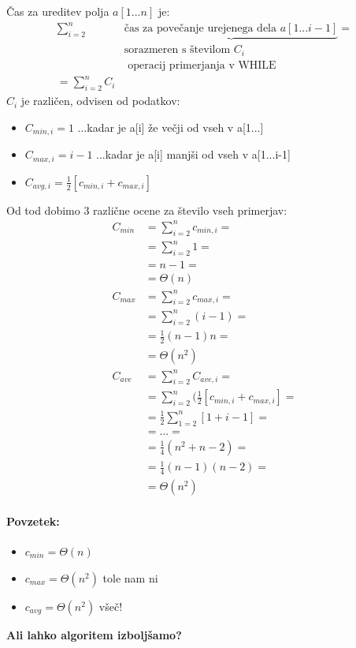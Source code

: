 \documentclass[a4paper,10pt]{article}
\begin{document}
\v Cas za ureditev polja $a[1...n]$ je:
\begin{equation}
\begin{array}{rc}
\sum_{i=2}^{n} & \underbrace{\mbox{\v cas za pove\v canje urejenega dela } a[1...i-1]} =\\
 & \mbox{sorazmeren s \v stevilom } C_i\\
 & \mbox{ operacij primerjanja v WHILE}\\
= \sum_{i=2}^{n} C_i &
\end{array}
\end{equation}
$C_i$ je razli\v cen, odvisen od podatkov:
\begin{itemize}
\item $C_{min,i}=1$ ...kadar je a[i] \v ze ve\v cji od vseh v a[1...]
\item $C_{max,i}=i-1$ ...kadar je a[i] manj\v si od vseh v a[1...i-1]
\item $C_{avg,i}=\frac{1}{2}[c_{min,i}+c_{max,i}]$
\end{itemize}
\vspace{10pt}
Od tod dobimo 3 razli\v cne ocene za \v stevilo vseh primerjav:\\
$$
\begin{array}{ll}
C_{min} & = \sum_{i=2}^{n} c_{min,i} = \\
        & = \sum_{i=2}^{n} 1 = \\
        & = n-1 = \\
        & = \Theta(n)\\
C_{max} & = \sum_{i=2}^{n} c_{max,i} = \\
        & = \sum_{i=2}^{n}(i-1) = \\
        & = \frac{1}{2}(n-1)n = \\
        & = \Theta(n^2)\\
C_{ave} & = \sum_{i=2}^{n}C_{ave,i} = \\
        & = \sum_{i=2}^{n}(\frac{1}{2}[c_{min,i}+c_{max,i}] = \\
        & = \frac{1}{2} \sum_{1=2}^{n}[1+i-1] = \\
        & = ... = \\
        & = \frac{1}{4}(n^2+n-2) = \\
        & = \frac{1}{4}(n-1)(n-2) = \\
        & = \Theta(n^2)
\end{array}
$$

\paragraph{Povzetek:}
\begin{itemize}
\item $c_{min}=\Theta(n)$
\item $c_{max}=\Theta(n^2)$  tole nam ni
\item $c_{avg}=\Theta(n^2)$  v\v se\v c!
\end{itemize}
\textbf{Ali lahko algoritem izbolj\v samo?}
\end{document}
